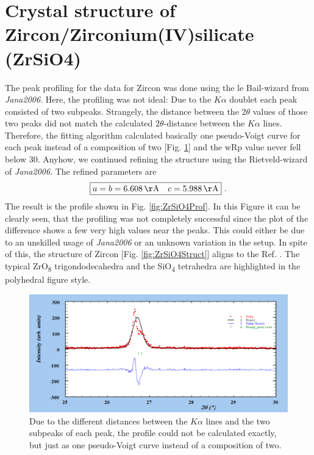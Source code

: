 \newpage

\section{Crystal structure of Zircon/Zirconium(IV)silicate (ZrSiO4)}
\label{sec:ZrSiO4}

The peak profiling for the data for Zircon was done using the le Bail-wizard from \textit{Jana2006}. Here, the profiling was not ideal: Due to the $K\alpha$ doublet each peak consisted of two subpeaks. Strangely, the distance between the $2\theta$ values of those two peaks did not match the calculated $2\theta$-distance between the $K\alpha$ lines. Therefore, the fitting algorithm calculated basically one pseudo-Voigt curve for each peak instead of a composition of two [Fig. \ref{fig:demoShitPeaks}] and the wRp value never fell below 30. Anyhow, we continued refining the structure using the Rietveld-wizard of \textit{Jana2006}. The refined parameters are
\begin{gather*}
    \boxed{a = b = 6.608\,\mathrm{\AA} \quad c = 5.988\,\mathrm{\AA}}~.
\end{gather*}
The result is the profile shown in Fig. \ref{fig:ZrSiO4Prof}. In this Figure it can be clearly seen, that the profiling was not completely successful since the plot of the difference shows a few very high values near the peaks. This could either be due to an unskilled usage of \textit{Jana2006} or an unknown variation in the setup. In spite of this, the structure of Zircon [Fig. \ref{fig:ZrSiO4Struct}] aligns to the Ref. . The typical ZrO\textsubscript{8} trigondodecahedra and the SiO\textsubscript{4} tetrahedra are highlighted in the polyhedral figure style. 

\begin{center}
    \begin{figure}
    \centering
    \includegraphics[width = 0.9\textheight]{Pictures/Evaluation/43/ZrSiO4DemoPeak.png}
    \caption{
        Due to the different distances between the $K\alpha$ lines and the two subpeaks of each peak, the profile could not be calculated exactly, but just as one pseudo-Voigt curve instead of a composition of two.
    }
    \label{fig:demoShitPeaks} 
    \end{figure}
\end{center}

